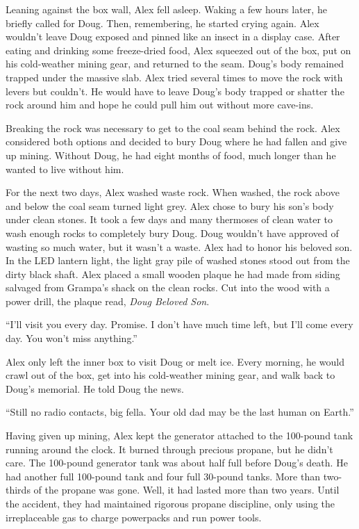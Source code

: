 Leaning against the box wall, Alex fell asleep. Waking a few hours
later, he briefly called for Doug. Then, remembering, he started crying
again. Alex wouldn't leave Doug exposed and pinned like an insect in a
display case. After eating and drinking some freeze-dried food, Alex
squeezed out of the box, put on his cold-weather mining gear, and
returned to the seam. Doug's body remained trapped under the massive
slab. Alex tried several times to move the rock with levers but
couldn't. He would have to leave Doug's body trapped or shatter the rock
around him and hope he could pull him out without more cave-ins.

Breaking the rock was necessary to get to the coal seam behind the rock.
Alex considered both options and decided to bury Doug where he had
fallen and give up mining. Without Doug, he had eight months of food,
much longer than he wanted to live without him.

For the next two days, Alex washed waste rock. When washed, the rock
above and below the coal seam turned light grey. Alex chose to bury his
son's body under clean stones. It took a few days and many thermoses of
clean water to wash enough rocks to completely bury Doug. Doug wouldn't
have approved of wasting so much water, but it wasn't a waste. Alex had
to honor his beloved son. In the LED lantern light, the light gray pile
of washed stones stood out from the dirty black shaft. Alex placed a
small wooden plaque he had made from siding salvaged from Grampa's shack
on the clean rocks. Cut into the wood with a power drill, the plaque
read, \emph{Doug Beloved Son}.

``I'll visit you every day. Promise. I don't have much time left, but
I'll come every day. You won't miss anything.''

Alex only left the inner box to visit Doug or melt ice. Every morning,
he would crawl out of the box, get into his cold-weather mining gear,
and walk back to Doug's memorial. He told Doug the news.

``Still no radio contacts, big fella. Your old dad may be the last human
on Earth.''

Having given up mining, Alex kept the generator attached to the
100-pound tank running around the clock. It burned through precious
propane, but he didn't care. The 100-pound generator tank was about half
full before Doug's death. He had another full 100-pound tank and four
full 30-pound tanks. More than two-thirds of the propane was gone. Well,
it had lasted more than two years. Until the accident, they had
maintained rigorous propane discipline, only using the irreplaceable gas
to charge powerpacks and run power tools.

